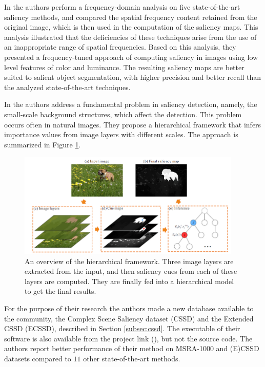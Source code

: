 In \cite{LCAV-CONF-2009-012} the authors perform a frequency-domain analysis on five state-of-the-art saliency methods, and compared the spatial frequency
content retained from the original image, which is then used in the computation of the saliency maps. This analysis illustrated that the deficiencies of these techniques
arise from the use of an inappropriate range of spatial frequencies. Based on this analysis, they presented a frequency-tuned
approach of computing saliency in images using low level features of color and luminance. The resulting saliency maps are better suited to salient object segmentation, with higher precision and better recall than the analyzed state-of-the-art techniques.

In \cite{YanCVPR2013} the authors address a fundamental problem in saliency detection, namely, the small-scale background structures, which affect the detection. This problem occurs often in natural images. They propose a hierarchical framework that infers importance values from image layers with different scales. The approach is summarized in Figure \ref{fig:hier_yan13}.

\begin{figure}[H]
\begin{center}
\includegraphics[width=0.95\textwidth]{fig/Hierarchy_Yan13}
\end{center}
\caption{An overview of the hierarchical framework. Three image layers are extracted from the input, and then  saliency cues from each of these layers are computed. They are finally fed into a hierarchical model to get the final results.}
\label{fig:hier_yan13}
\end{figure}

For the purpose of their research the authors made a new database available to the community, the Complex Scene Saliency dataset (CSSD) and the Extended CSSD (ECSSD), described in Section \ref{subsec:cssd}. The executable of their software is also available from the project link (\cite{ecssd_db}), but not the source code. The authors report better performance of their method on MSRA-1000 and (E)CSSD datasets compared to $11$ other state-of-the-art methods.

